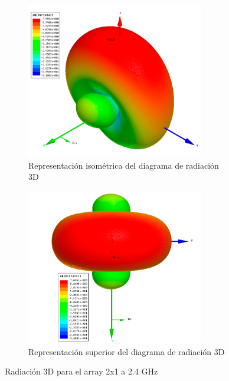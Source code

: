 \begin{figure}[H]
     \centering
     \begin{subfigure}[b]{0.7\textwidth}
         \centering
         \includegraphics[width=0.85\textwidth]{archivos/analisis/2x11/6}
         \caption{Representación isométrica del diagrama de radiación 3D}
         \label{fig:3d12x11}
     \end{subfigure}
     \hfill
     \begin{subfigure}[b]{0.7\textwidth}
         \centering
         \includegraphics[width=0.85\textwidth]{archivos/analisis/2x11/7}
         \caption{Representación superior del diagrama de radiación 3D}
         \label{fig:3d22x11}
     \end{subfigure}
     \hfill
        \caption{Radiación 3D para el array 2x1 a 2.4 GHz}
        \label{fig:3d2x11}
\end{figure}


